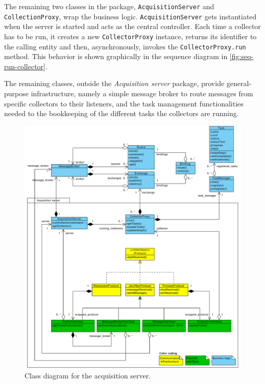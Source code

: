The remaining two classes in the package, \texttt{AcquisitionServer} and \texttt{CollectionProxy}, wrap the business logic. \texttt{AcquisitionServer} gets instantiated when the server is started and acts as the central controller. Each time a collector has to be run, it creates a new \texttt{CollectorProxy} instance, returns its identifier to the calling entity and then, asynchronously, invokes the \texttt{CollectorProxy.run} method. This behavior is shown graphically in the sequence diagram in \vref{fig:seq-run-collector}.

The remaining classes, outside the \emph{Acquisition server} package, provide general-purpose infrastructure, namely a simple message broker to route messages from specific collectors to their listeners, and the task management functionalities needed to the bookkeeping of the different tasks the collectors are running.

\begin{figure}
  \begin{adjustwidth}{-1mm}{5mm}
    \includegraphics[width=\linewidth]{images/diagrams/class-collector-server}
  \end{adjustwidth}
  \caption[Class diagram for the acquisition server.]{Class diagram for the acquisition server.}
  \label{fig:class-collector-server}
  \vspace{1cm}
\end{figure}

